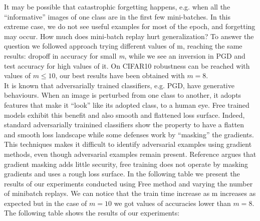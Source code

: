 \documentclass{article}
\begin{document}
It may be possible that catastrophic forgetting happens, e.g. when all the “informative” images of one class are in the first few mini-batches. In this extreme case, we do not see useful examples for most of the epoch, and forgetting may occur.
How much does mini-batch replay hurt generalization?
To answer the question we followed \cite{ShafahiEtAl2019b} approach trying different values of m, reaching the same results: dropoff in accuracy for small \textit{m}, while we see an inversion in PGD and test accuracy for high values of it. On CIFAR10 robustness can be reached with values of $m \leq 10$, our best results have been obtained with $m = 8$.\\
It is known that adversarially trained classifiers, e.g. PGD,  have generative behaviours. When an image is perturbed from one class to another, it adopts features that make it “look” like its adopted class, to a human eye.
Free trained models exhibit this benefit and also smooth and flattened loss surface.
Indeed, standard adversarially trainined classifiers show the property to have a flatten and smooth loss landscape while some defenses work by “masking” the gradients. This techniques makes it difficult to identify
adversarial examples using gradient methods, even though adversarial examples remain present.
Reference \cite{EngstromEtAl2018} argues that gradient masking adds little security, free training does not operate by masking gradients and uses a rough loss surface.
In the following table we present the results of our experiments conducted using Free method and varying the number of minibatch replays. We can notice that the train time increase as m increases as expected but in the case of $m=10$ we got values of accuracies lower than $m=8$.\\
The following table shows the results of our experiments:
\end{document}

